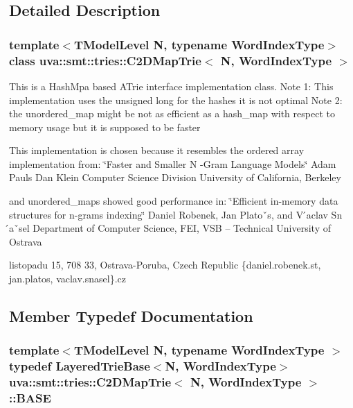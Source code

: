 \subsection{Detailed Description}
\subsubsection*{template$<$T\+Model\+Level N, typename Word\+Index\+Type$>$class uva\+::smt\+::tries\+::\+C2\+D\+Map\+Trie$<$ N, Word\+Index\+Type $>$}

This is a Hash\+Mpa based A\+Trie interface implementation class. Note 1\+: This implementation uses the unsigned long for the hashes it is not optimal Note 2\+: the unordered\+\_\+map might be not as efficient as a hash\+\_\+map with respect to memory usage but it is supposed to be faster

This implementation is chosen because it resembles the ordered array implementation from\+: \char`\"{}\+Faster and Smaller N -\/\+Gram Language Models\char`\"{} Adam Pauls Dan Klein Computer Science Division University of California, Berkeley

and unordered\+\_\+maps showed good performance in\+: \char`\"{}\+Efficient in-\/memory data structures for n-\/grams indexing\char`\"{} Daniel Robenek, Jan Platoˇs, and V ́aclav Sn ́aˇsel Department of Computer Science, F\+E\+I, V\+S\+B – Technical University of Ostrava
\begin{DoxyEnumerate}
\item listopadu 15, 708 33, Ostrava-\/\+Poruba, Czech Republic \{daniel.\+robenek.\+st, jan.\+platos, vaclav.\+snasel\}.cz 
\end{DoxyEnumerate}

\subsection{Member Typedef Documentation}
\hypertarget{classuva_1_1smt_1_1tries_1_1_c2_d_map_trie_ab3edfe4a537868a96d867ace37607fee}{}
\subsubsection[{B\+A\+S\+E}]{\setlength{\rightskip}{0pt plus 5cm}template$<$T\+Model\+Level N, typename Word\+Index\+Type $>$ typedef {\bf Layered\+Trie\+Base}$<$N, {\bf Word\+Index\+Type}$>$ {\bf uva\+::smt\+::tries\+::\+C2\+D\+Map\+Trie}$<$ N, {\bf Word\+Index\+Type} $>$\+::{\bf B\+A\+S\+E}}\label{classuva_1_1smt_1_1tries_1_1_c2_d_map_trie_ab3edfe4a537868a96d867ace37607fee}


